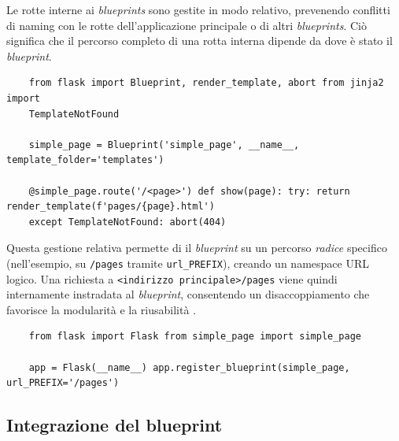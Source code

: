 Le rotte interne ai \textit{blueprints} sono gestite in modo relativo, prevenendo
conflitti di naming con le rotte dell'applicazione principale o di altri \textit{blueprints}.
Ciò significa che il percorso completo di una rotta interna dipende da dove è stato
 il \textit{blueprint}.

\begin{listing}
  [!ht]
  \caption{Codice del file \texttt{simple\_page.py} che descrive un blueprint in
  Flask}
  \label{lst:flask-blueprint} %
  \begin{verbatim}
    from flask import Blueprint, render_template, abort from jinja2 import
    TemplateNotFound

    simple_page = Blueprint('simple_page', __name__, template_folder='templates')

    @simple_page.route('/<page>') def show(page): try: return render_template(f'pages/{page}.html')
    except TemplateNotFound: abort(404)
  \end{verbatim}
\end{listing}

Questa gestione relativa permette di  il \textit{blueprint} su un
percorso \textit{radice} specifico (nell'esempio, su \texttt{/pages} tramite
\texttt{url\_PREFIX}), creando un namespace URL logico. Una richiesta a \texttt{<indirizzo
principale>/pages} viene quindi internamente instradata al \textit{blueprint}, consentendo
un disaccoppiamento che favorisce la modularità e la riusabilità \cite{palets_blueprints}.

\begin{listing}
  [!ht]
  \caption{Blueprint \texttt{simple\_page} montata in /pages}
  \label{lst:python_blueprint_registration} %
  \begin{verbatim}
    from flask import Flask from simple_page import simple_page

    app = Flask(__name__) app.register_blueprint(simple_page, url_PREFIX='/pages')
  \end{verbatim}
\end{listing}

\subsection{Integrazione del blueprint}

